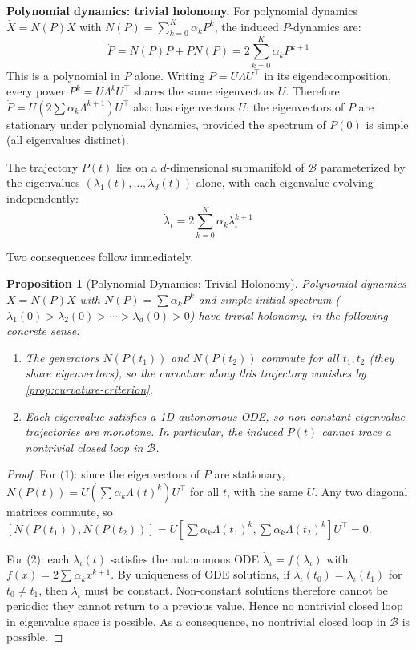 \documentclass{article}
\theoremstyle{plain}
\newtheorem{proposition}{Proposition}
\theoremstyle{definition}
\theoremstyle{remark}
\begin{document}
\textbf{Polynomial dynamics: trivial holonomy.}
For polynomial dynamics $\dot{X} = N(P) X$ with $N(P) = \sum_{k=0}^K \alpha_k P^k$, the induced $P$-dynamics are:
\begin{equation}
\dot{P} = N(P) P + P N(P) = 2 \sum_{k=0}^K \alpha_k P^{k+1}
\end{equation}
This is a polynomial in $P$ alone. Writing $P = U \Lambda U^\top$ in its eigendecomposition, every power $P^k = U \Lambda^k U^\top$ shares the same eigenvectors $U$.
Therefore $\dot{P} = U (2 \sum \alpha_k \Lambda^{k+1}) U^\top$ also has eigenvectors $U$: the eigenvectors of $P$ are stationary under polynomial dynamics, provided the spectrum of $P(0)$ is simple (all eigenvalues distinct).

The trajectory $P(t)$ lies on a $d$-dimensional submanifold of $\mathcal{B}$ parameterized by the eigenvalues $(\lambda_1(t), \ldots, \lambda_d(t))$ alone, with each eigenvalue evolving independently:
\begin{equation}
\dot{\lambda}_\iota = 2 \sum_{k=0}^K \alpha_k \lambda_\iota^{k+1}
\end{equation}

Two consequences follow immediately.

\begin{proposition}[Polynomial Dynamics: Trivial Holonomy]\label{prop:poly-trivial-holonomy}
Polynomial dynamics $\dot{X} = N(P) X$ with $N(P) = \sum \alpha_k P^k$ and simple initial spectrum ($\lambda_1(0) > \lambda_2(0) > \cdots > \lambda_d(0) > 0$) have trivial holonomy, in the following concrete sense:
\begin{enumerate}
\item The generators $N(P(t_1))$ and $N(P(t_2))$ commute for all $t_1, t_2$ (they share eigenvectors), so the curvature \emph{along this trajectory} vanishes by \cref{prop:curvature-criterion}.
\item Each eigenvalue satisfies a 1D autonomous ODE, so non-constant eigenvalue trajectories are monotone. In particular, the induced $P(t)$ cannot trace a nontrivial closed loop in $\mathcal{B}$.
\end{enumerate}
\end{proposition}

\begin{proof}
For (1): since the eigenvectors of $P$ are stationary, $N(P(t)) = U (\sum \alpha_k \Lambda(t)^k) U^\top$ for all $t$, with the same $U$. Any two diagonal matrices commute, so $[N(P(t_1)), N(P(t_2))] = U [\sum \alpha_k \Lambda(t_1)^k, \sum \alpha_k \Lambda(t_2)^k] U^\top = 0$.

For (2): each $\lambda_\iota(t)$ satisfies the autonomous ODE $\dot{\lambda}_\iota = f(\lambda_\iota)$ with $f(x) = 2 \sum \alpha_k x^{k+1}$.
By uniqueness of ODE solutions, if $\lambda_\iota(t_0) = \lambda_\iota(t_1)$ for $t_0 \neq t_1$, then $\lambda_\iota$ must be constant.
Non-constant solutions therefore cannot be periodic: they cannot return to a previous value. Hence no nontrivial closed loop in eigenvalue space is possible. As a consequence, no nontrivial closed loop in $\mathcal{B}$ is possible.
\end{proof}
\end{document}
